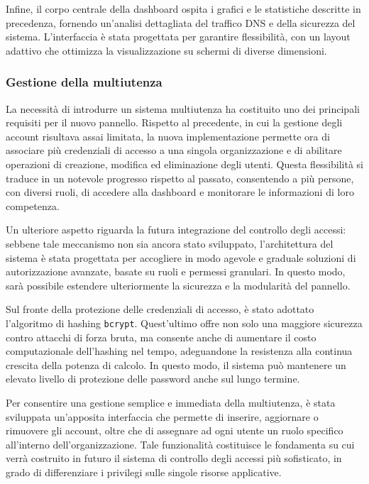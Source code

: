 Infine, il corpo centrale della dashboard ospita i grafici e le statistiche descritte in precedenza, fornendo un’analisi dettagliata del traffico DNS e della sicurezza del sistema. L’interfaccia è stata progettata per garantire flessibilità, con un layout adattivo che ottimizza la visualizzazione su schermi di diverse dimensioni.

\subsubsection{Gestione della multiutenza}
La necessità di introdurre un sistema multiutenza ha costituito uno dei principali requisiti per il nuovo pannello. Rispetto al precedente, in cui la gestione degli account risultava assai limitata, la nuova implementazione permette ora di associare più credenziali di accesso a una singola organizzazione e di abilitare operazioni di creazione, modifica ed eliminazione degli utenti. Questa flessibilità si traduce in un notevole progresso rispetto al passato, consentendo a più persone, con diversi ruoli, di accedere alla dashboard e monitorare le informazioni di loro competenza.

Un ulteriore aspetto riguarda la futura integrazione del controllo degli accessi: sebbene tale meccanismo non sia ancora stato sviluppato, l’architettura del sistema è stata progettata per accogliere in modo agevole e graduale soluzioni di autorizzazione avanzate, basate su ruoli e permessi granulari. In questo modo, sarà possibile estendere ulteriormente la sicurezza e la modularità del pannello.

Sul fronte della protezione delle credenziali di accesso, è stato adottato l’algoritmo di hashing \texttt{bcrypt}. Quest’ultimo offre non solo una maggiore sicurezza contro attacchi di forza bruta, ma consente anche di aumentare il costo computazionale dell’hashing nel tempo, adeguandone la resistenza alla continua crescita della potenza di calcolo. In questo modo, il sistema può mantenere un elevato livello di protezione delle password anche sul lungo termine.

Per consentire una gestione semplice e immediata della multiutenza, è stata sviluppata un’apposita interfaccia che permette di inserire, aggiornare o rimuovere gli account, oltre che di assegnare ad ogni utente un ruolo specifico all’interno dell’organizzazione. Tale funzionalità costituisce le fondamenta su cui verrà costruito in futuro il sistema di controllo degli accessi più sofisticato, in grado di differenziare i privilegi sulle singole risorse applicative.

